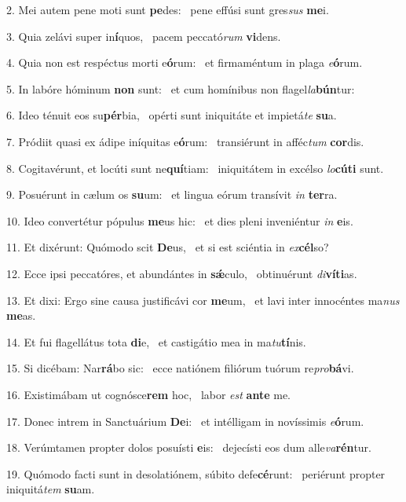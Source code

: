 2. Mei autem pene moti sunt \textbf{pe}des: \ast\  pene effúsi sunt gres\textit{sus} \textbf{me}i.\

3. Quia zelávi super in\textbf{í}quos, \ast\  pacem peccató\textit{rum} \textbf{vi}dens.\

4. Quia non est respéctus morti e\textbf{ó}rum: \ast\  et firmaméntum in plaga \textit{e}\textbf{ó}rum.\

5. In labóre hóminum \textbf{non} sunt: \ast\  et cum homínibus non flagel\textit{la}\textbf{bún}tur:\

6. Ideo ténuit eos su\textbf{pér}bia, \ast\  opérti sunt iniquitáte et impietá\textit{te} \textbf{su}a.\

7. Pródiit quasi ex ádipe iníquitas e\textbf{ó}rum: \ast\  transiérunt in afféc\textit{tum} \textbf{cor}dis.\

8. Cogitavérunt, et locúti sunt ne\textbf{quí}tiam: \ast\  iniquitátem in excélso \textit{lo}\textbf{cú}\textbf{ti} sunt.\

9. Posuérunt in cælum os \textbf{su}um: \ast\  et lingua eórum transívit \textit{in} \textbf{ter}ra.\

10. Ideo convertétur pópulus \textbf{me}us hic: \ast\  et dies pleni inveniéntur \textit{in} \textbf{e}is.\

11. Et dixérunt: Quómodo scit \textbf{De}us, \ast\  et si est sciéntia in \textit{ex}\textbf{cél}so?\

12. Ecce ipsi peccatóres, et abundántes in \textbf{sǽ}culo, \ast\  obtinuérunt \textit{di}\textbf{ví}\textbf{ti}as.\

13. Et dixi: Ergo sine causa justificávi cor \textbf{me}um, \ast\  et lavi inter innocéntes ma\textit{nus} \textbf{me}as.\

14. Et fui flagellátus tota \textbf{di}e, \ast\  et castigátio mea in ma\textit{tu}\textbf{tí}nis.\

15. Si dicébam: Nar\textbf{rá}bo sic: \ast\  ecce natiónem filiórum tuórum re\textit{pro}\textbf{bá}vi.\

16. Existimábam ut cognósce\textbf{rem} hoc, \ast\  labor \textit{est} \textbf{an}\textbf{te} me.\

17. Donec intrem in Sanctuárium \textbf{De}i: \ast\  et intélligam in novíssimis \textit{e}\textbf{ó}rum.\

18. Verúmtamen propter dolos posuísti \textbf{e}is: \ast\  dejecísti eos dum alle\textit{va}\textbf{rén}tur.\

19. Quómodo facti sunt in desolatiónem, súbito defe\textbf{cé}runt: \ast\  periérunt propter iniquitá\textit{tem} \textbf{su}am.\


